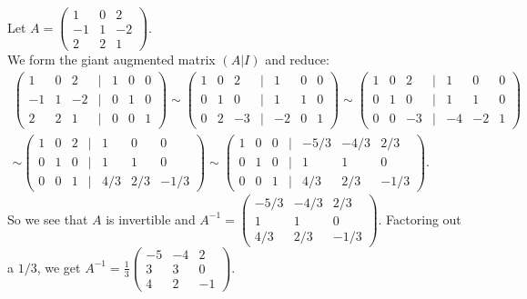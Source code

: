 \documentclass[12pt]{article}
\def\it{\item}
\def\lp{\left(} \def\rp{\right)} \def\abs#1{\vert #1 \vert}
\def\Frac#1#2{\displaystyle{\frac{#1}{#2}}}
\begin{document}
\it Let $A = \lp \begin{array}{rrr} 1 & 0 & 2 \\ -1 & 1 & -2 \\ 2 & 2 & 1 \end{array} \rp$. \\
We form the giant augmented matrix $(A | I)$ and reduce:
\begin{align*}
\lp \begin{array}{rrrcrrr} 
		 1 & 0 & 2  & | & 1 & 0 & 0 \\ 
		-1 & 1 & -2 & | & 0 & 1 & 0 \\ 
		 2 & 2 & 1 & | & 0 & 0 & 1 \end{array} \rp \sim 
\lp \begin{array}{rrrcrrr}
		1 & 0 &  2 & | &  1 & 0 & 0 \\ 
		0 & 1 &  0 & | &  1 & 1 & 0 \\ 
		0 & 2 & -3 & | & -2 & 0 & 1 \end{array} \rp \sim
\lp \begin{array}{rrrcrrr} 
		1 & 0 &  2 & | &  1 &  0 & 0 \\ 
		0 & 1 &  0 & | &  1 &  1 & 0 \\ 
		0 & 0 & -3 & | & -4 & -2 & 1 \end{array} \rp \\ \sim
\lp \begin{array}{rrrcrrr}
		1 & 0 & 2 & | &  1   &  0  & 0 \\ 
		0 & 1 & 0 & | &  1   &  1  & 0 \\ 
		0 & 0 & 1 & | &  4/3 & 2/3 & -1/3 \end{array} \rp \sim 
\lp \begin{array}{rrrcrrr} 
		1 & 0 & 0 & | &  -5/3 & -4/3 & 2/3 \\ 
		0 & 1 & 0 & | &  1    &  1   & 0 \\ 
		0 & 0 & 1 & | &  4/3  & 2/3  & -1/3 \end{array} \rp.
\end{align*}
So we see that $A$ is invertible and $A^{-1} = \lp \begin{array}{rrr} -5/3 & -4/3 & 2/3 \\ 1 & 1 & 0 \\ 4/3  & 2/3  & -1/3 \end{array} \rp$. Factoring out a $1/3$, we get $A^{-1} = \Frac{1}{3} \lp \begin{array}{rrr} -5 & -4 & 2 \\ 3 & 3 & 0 \\ 4 & 2 & -1 \end{array} \rp$.
\end{document}
